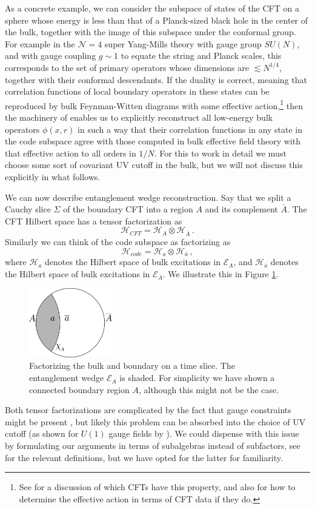 \documentclass[aps,nofootinbib,longbibliography,superscriptaddress,12pt]{revtex4-1}
\newcommand{\be}{\begin{equation}}
\newcommand{\ee}{\end{equation}}
\newcommand{\EA}{\mathcal{E}_A}
\newcommand{\Ab}{\overline{A}}
\newcommand{\HA}{\mathcal{H}_A}
\newcommand{\HAb}{\mathcal{H}_{\overline{A}}}
\newcommand{\Hc}{\mathcal{H}_{code}}
\newcommand{\Ha}{\mathcal{H}_a}
\newcommand{\Hab}{\mathcal{H}_{\overline{a}}}
\newcommand{\bfig}{\begin{figure}\begin{center}}
\newcommand{\efig}{\end{center}\end{figure}}
\begin{document}
As a concrete example, we can consider the subspace of states of the CFT on a sphere whose energy is less than that of a Planck-sized black hole in the center of the bulk, together with the image of this subspace under the conformal group.  For example in the $\mathcal{N}=4$ super Yang-Mills theory with gauge group $SU(N)$, and with gauge coupling $g\sim 1$ to equate the string and Planck scales, this corresponds to the set of primary operators whose dimensions are $\lesssim N^{1/4}$, together with their conformal descendants.  If the duality is correct, meaning that correlation functions of local boundary operators in these states can be reproduced by bulk Feynman-Witten diagrams with some effective action,\footnote{See \cite{Heemskerk:2009pn} for a discussion of which CFTs have this property, and also for how to determine the effective action in terms of CFT data if they do.} then the machinery of \cite{Banks:1998dd,Hamilton:2006az,Kabat:2011rz,Heemskerk:2012mn,Kabat:2012hp,Heemskerk:2012np,Morrison:2014jha} enables us to explicitly reconstruct all low-energy bulk operators $\phi(x,r)$ in such a way that their correlation functions in any state in the code subspace agree with those computed in bulk effective field theory with that effective action to all orders in $1/N$.  For this to work in detail we must choose some sort of covariant UV cutoff in the bulk, but we will not discuss this explicitly in what follows.

We can now describe entanglement wedge reconstruction.  Say that we split a Cauchy slice $\Sigma$ of the boundary CFT into a region $A$ and its complement $\Ab$.  The CFT Hilbert space has a tensor factorization as
\be
\mathcal{H}_{CFT}=\HA\otimes \HAb \,.
\ee
Similarly we can think of the code subspace as factorizing as
\be\label{codefactor}
\Hc=\Ha\otimes \Hab \,,
\ee
where $\Ha$ denotes the Hilbert space of bulk excitations in $\EA$, and $\Hab$ denotes the Hilbert space of bulk excitations in $\mathcal{E}_{\overline{A}}$.  We illustrate this in Figure \ref{fig}.
\bfig
\includegraphics[height=3cm]{f}
\caption{Factorizing the bulk and boundary on a time slice.  The entanglement wedge $\EA$ is shaded.  For simplicity we have shown a connected boundary region $A$, although this might not be the case. }\label{fig}
\efig
Both tensor factorizations are complicated by the fact that gauge constraints might be present \cite{Donnelly:2011hn,Casini:2013rba,Donnelly:2014fua,Donnelly:2015hxa,Radicevic:2015sza,Soni:2015yga,Ma:2015xes,Donnelly:2016auv}, but likely this problem can be absorbed into the choice of UV cutoff (as shown for $U(1)$ gauge fields by \cite{Harlow:2015lma}).  We could dispense with this issue by formulating our arguments in terms of subalgebras instead of subfactors, see \cite{Casini:2013rba} for the relevant definitions, but we have opted for the latter for familiarity.
\end{document}
